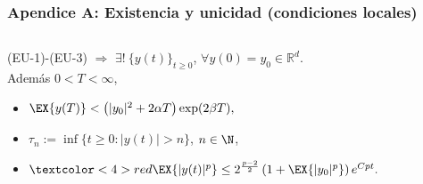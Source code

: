 \begin{frame}[label=ExistenciaMao,noframenumbering]
    \frametitle{Apendice A: Existencia y unicidad (condiciones locales)}        
    \begin{overlayarea}{\textwidth}{1.0\textheight} 
    \begin{columns}
            \begin{Teorema}
                 (EU-1)-(EU-3)              
                $\Rightarrow$ 
                $\exists ! \  \{y(t)\}_{t\geq 0}$, $\forall y(0)=y_0\in 
\mathbb{R}^d$. 
                \\              
                Adem\'as $0<T<\infty$,
                \begin{itemize}[<+-|alert@+>]
                    \item               
                    $
                        \EX{y(T)}< 
                            \left(
                                |y_0|^2 +2\alpha T 
                            \right)\exp(2\beta T),
                    $
                    \item               
                    $\tau_n := \inf \{ t\geq 0 : |y(t)|>n\}$, $n\in \N$,         
           
                    \item<4>                    
                        $
                            \textcolor<4>{red}{
                                \EX{|y(t)|^p}
                                \leq
                                2^{\frac{p-2}{2}}
                                \left(
                                1 + \EX{|y_0|^p}
                                \right)e^{Cpt}.             
                            }
                        $           
                \end{itemize}           
            \end{Teorema}
            \begin{bibunit}[apalike]        
                \cite{Mao2013}          
            \end{bibunit}
    \end{columns}
        
    \hyperlink{Construccion<1>}{
    }
    \end{overlayarea}
\end{frame}
